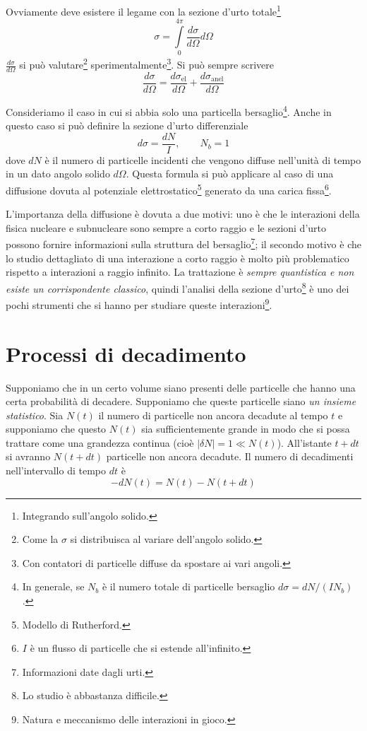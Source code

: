 Ovviamente deve esistere il legame con la sezione d'urto totale\footnote{Integrando sull'angolo solido. }
\begin{equation}
 \sigma = \int\limits^{4\pi}_0\frac{d\sigma}{d\Omega}d\Omega
\end{equation}
$\frac{d\sigma}{d\Omega}$ si può valutare\footnote{Come la $\sigma$ si distribuisca al variare dell'angolo solido. } sperimentalmente\footnote{Con contatori di particelle diffuse da spostare ai vari angoli. }. Si può sempre scrivere
\[
\frac{d\sigma}{d\Omega} = \frac{d\sigma_\text{el}}{d\Omega} + \frac{d\sigma_\text{anel}}{d\Omega}
\]

Consideriamo il caso in cui si abbia solo una particella bersaglio\footnote{In generale, se $N_b$ è il numero totale di particelle bersaglio $d\sigma = dN/(IN_b)$. }. Anche in questo caso si può definire la sezione d'urto differenziale
\[
d\sigma = \frac{dN}{I}, \qquad N_b = 1
\]
dove $dN$ è il numero di particelle incidenti che vengono diffuse nell'unità di tempo in un dato angolo solido $d\Omega$. Questa formula si può applicare al caso di una diffusione dovuta al potenziale elettrostatico\footnote{Modello di Rutherford. } generato da una carica fissa\footnote{$I$ è un flusso di particelle che si estende all'infinito. }.

L'importanza della diffusione è dovuta a due motivi: uno è che le interazioni della fisica nucleare e subnucleare  sono sempre a corto raggio e le sezioni d'urto possono fornire informazioni sulla struttura del bersaglio\footnote{Informazioni date dagli urti. }; il secondo motivo è che lo studio dettagliato di una interazione a corto raggio è molto più problematico rispetto a interazioni a raggio infinito. La trattazione è \textit{sempre quantistica e non esiste un corrispondente classico}, quindi l'analisi della sezione d'urto\footnote{Lo studio è abbastanza difficile. } è uno dei pochi strumenti che si hanno per studiare queste interazioni\footnote{Natura e meccanismo delle interazioni in gioco. }.

\section{Processi di decadimento}


Supponiamo che in un certo volume siano presenti delle particelle che hanno una certa probabilità di decadere. Supponiamo che queste particelle siano \textit{un insieme statistico}. Sia $N(t)$ il numero di particelle non ancora decadute al tempo $t$ e supponiamo che questo $N(t)$ sia sufficientemente grande in modo che si possa trattare come una grandezza continua (cioè $\lvert \delta N\rvert = 1 \ll N(t)$). All'istante $t + dt$ si avranno $N(t+dt)$ particelle non ancora decadute. Il numero di decadimenti nell'intervallo di tempo $dt$ è
\[
-dN(t) = N(t) - N(t+dt)
\]

